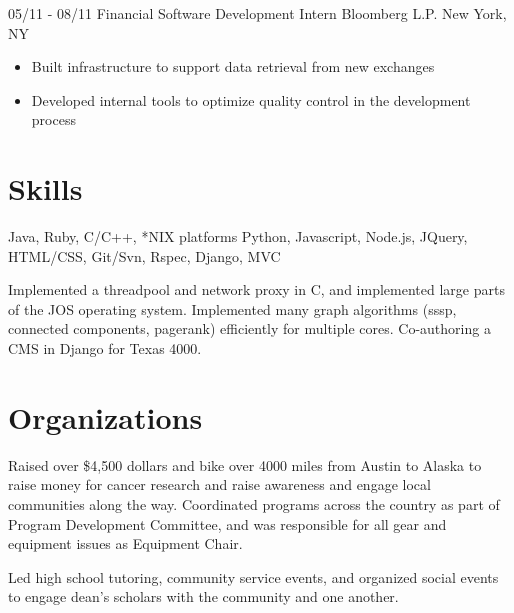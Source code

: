 \documentclass[11pt,letter,sans]{moderncv}
\begin{document}
\cventry
{05/11 - 08/11}
{Financial Software Development Intern}
{Bloomberg L.P.}
{New York, NY}
{}
{
  \begin{itemize}
    \item Built infrastructure to support data retrieval from new exchanges
    \item Developed internal tools to optimize quality control in the
      development process
\end{itemize}}



\section{Skills}
{Java, Ruby, C/C++, *NIX platforms}
{Python, Javascript, Node.js, JQuery, HTML/CSS, Git/Svn, Rspec, Django, MVC}

{Implemented a threadpool and network proxy in C, and implemented large parts
of the JOS operating system. Implemented many graph algorithms (sssp, connected
components, pagerank) efficiently for multiple cores. Co-authoring a CMS in
Django for Texas 4000.}

\section{Organizations}
{Raised over \$4,500 dollars and bike over 4000 miles from Austin to Alaska to raise money for cancer research and raise awareness and engage local communities along the way. Coordinated programs across the country as part of Program Development Committee, and was responsible for all gear and equipment issues as Equipment Chair.}

{Led high school tutoring, community service events, and organized social events
to engage dean's scholars with the community and one another.}
\end{document}
